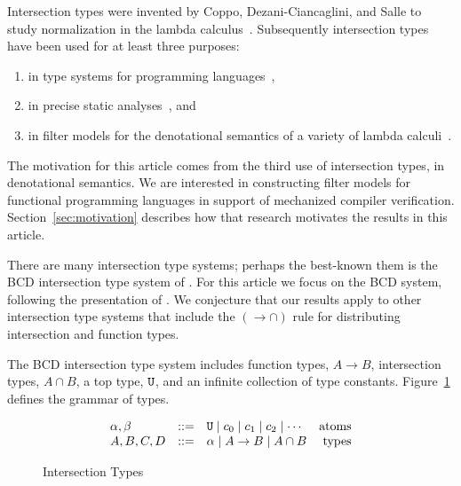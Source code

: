 \documentclass{article}
\begin{document}
Intersection types were invented by Coppo, Dezani-Ciancaglini, and
Salle to study normalization in the lambda
calculus~\citep{Coppo:1979aa}. Subsequently intersection types have
been used for at least three purposes:
\begin{enumerate}
  \item in type systems for programming
    languages~\citep{Reynolds:1988aa,Pierce:1991aa,Castagna:2014aa,Chaudhuri:2014aa,Oliveira:2016aa,Amin:2017aa,Muehlboeck:2018aa,Bi:2019aa,Dunfield:2019aa,Microsoft:TypeScript2020aa},
  \item in precise static
    analyses~\citep{Turbak:1997aa,Palsberg:1998aa,Mossin:2003aa,Simoes:2007aa},
    and
  \item in filter models for the denotational semantics of a variety
    of lambda
    calculi~\citep{Coppo:1980ab,Coppo:1981aa,Coppo:1984aa,Honsell:1992aa,Abramsky:1993fk,Honsell:1999aa,Ishihara:2002aa,Rocca:2004aa,Dezani-Ciancaglini:2005aa,Alessi:2006aa,Barendregt:2013aa}.
\end{enumerate}
The motivation for this article comes from the third use of
intersection types, in denotational semantics.  We are interested in
constructing filter models for functional programming languages in
support of mechanized compiler
verification. Section~\ref{sec:motivation} describes how that research
motivates the results in this article.

There are many intersection type systems; perhaps the best-known them
is the BCD intersection type system of \citet{Barendregt:1983aa}. For
this article we focus on the BCD system, following the presentation of
\citet{Barendregt:2013aa}. We conjecture that our results apply to
other intersection type systems that include the $({\to}{\cap})$ rule
for distributing intersection and function types.

The BCD intersection type system includes function types, $A \to B$,
intersection types, $A \cap B$, a top type, $\mathtt{U}$, and an infinite
collection of type constants. Figure~\ref{fig:types} defines the
grammar of types.

\begin{figure}[tbp]
  \[
  \begin{array}{lclr}
    \alpha,\beta & ::= & \mathtt{U} \mid c_0 \mid c_1 \mid c_2 \mid \cdots & \text{atoms}\\
    A,B,C,D & ::= & \alpha \mid A \to B \mid A \cap B & \text{types}
  \end{array}
  \]
  \caption{Intersection Types}
  \label{fig:types}
\end{figure}
\end{document}
